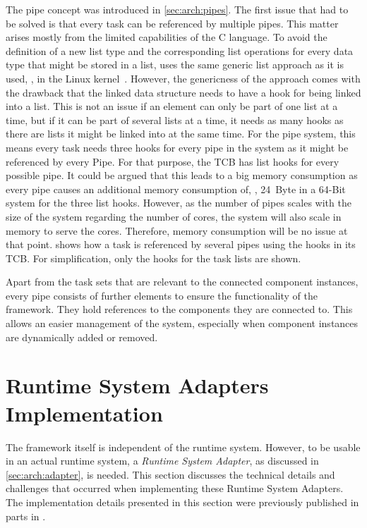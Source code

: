 The pipe concept was introduced in \cref{sec:arch:pipes}. The first issue that had to be solved is that every task can be referenced by multiple pipes. This matter arises mostly from the limited capabilities of the C language. To avoid the definition of a new list type and the corresponding list operations for every data type that might be stored in a list, \cobas{} uses the same generic list approach as it is used, \eg{}, in the Linux kernel~\cite[\cf{}][87--89]{Bovet-2005-LinuxKernel}. However, the genericness of the approach comes with the drawback that the linked data structure needs to have a hook for being linked into a list. This is not an issue if an element can only be part of one list at a time, but if it can be part of several lists at a time, it needs as many hooks as there are lists it might be linked into at the same time. For the pipe system, this means every task needs three hooks for every pipe in the system as it might be referenced by every Pipe. For that purpose, the \cobas{} \ac{TCB} has list hooks for every possible pipe. It could be argued that this leads to a big memory consumption as every pipe causes an additional memory consumption of, \eg{}, 24~Byte in a 64-Bit system for the three list hooks. However, as the number of pipes scales with the size of the system regarding the number of cores, the system will also scale in memory to serve the cores. Therefore, memory consumption will be no issue at that point.  shows how a task is referenced by several pipes using the hooks in its \ac{TCB}. For simplification, only the hooks for the task lists are shown.

Apart from the task sets that are relevant to the connected component instances, every pipe consists of further elements to ensure the functionality of the \cobas{} framework. They hold references to the components they are connected to. This allows an easier management of the system, especially when component instances are dynamically added or removed.

\section{Runtime System Adapters Implementation}

The \cobas{} framework itself is independent of the runtime system. However, to be usable in an actual runtime system, a \emph{Runtime System Adapter}, as discussed in \cref{sec:arch:adapter}, is needed. This section discusses the technical details and challenges that occurred when implementing these Runtime System Adapters. The implementation details presented in this section were previously published in parts in \textcite{Busse-2015-CoBaS}.

